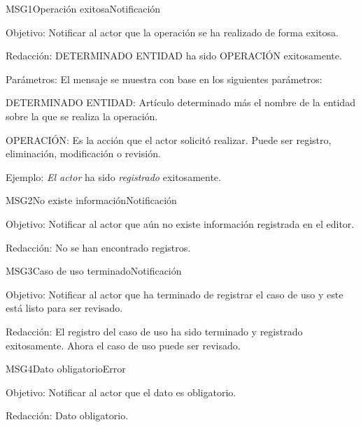 \begin{mensaje}{MSG1}{Operación exitosa}{Notificación}
    \item[Objetivo:] Notificar al actor que la operación se ha realizado de forma exitosa.
    \item[Redacción:] DETERMINADO ENTIDAD ha sido OPERACIÓN exitosamente.
    \item[Parámetros:] El mensaje se muestra con base en los siguientes parámetros:
    \begin{Citemize}
	\item DETERMINADO ENTIDAD: Artículo determinado más el nombre de la entidad sobre la que se realiza la operación.
	\item OPERACIÓN: Es la acción que el actor solicitó realizar. Puede ser registro, eliminación, modificación o revisión.
    \end{Citemize}
    \item[Ejemplo:] {\em El actor} ha sido {\em registrado} exitosamente.
\end{mensaje}

\begin{mensaje}{MSG2}{No existe información}{Notificación}
    \item[Objetivo:] Notificar al actor que aún no existe información registrada en el editor.
    \item[Redacción:] No se han encontrado registros.
\end{mensaje}

\begin{mensaje}{MSG3}{Caso de uso terminado}{Notificación}
    \item[Objetivo:] Notificar al actor que ha terminado de registrar el caso de uso y este está listo para ser revisado.
    \item[Redacción:] El registro del caso de uso ha sido terminado y registrado exitosamente. Ahora el caso de uso puede ser revisado.
\end{mensaje}

\begin{mensaje}{MSG4}{Dato obligatorio}{Error}
    \item[Objetivo:] Notificar al actor que el dato es obligatorio.
    \item[Redacción:] Dato obligatorio.
\end{mensaje}

